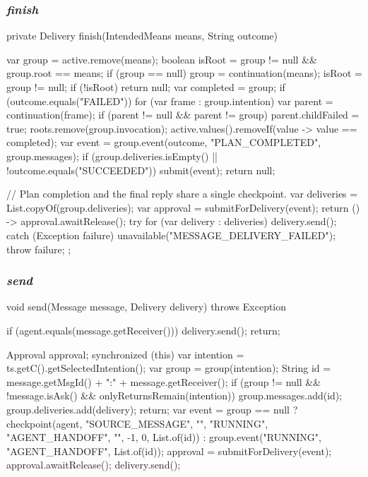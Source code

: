 \documentclass[12pt,a4paper,oneside]{extreport}
\begin{document}
\subsubsection*{\textit{finish}}
\begin{thesiscode}[firstnumber=224]
private Delivery finish(IntendedMeans means, String outcome) {
    var group = active.remove(means);
    boolean isRoot = group != null && group.root == means;
    if (group == null) { group = continuation(means); isRoot = group != null; }
    if (!isRoot) return null;
    var completed = group;
    if (outcome.equals("FAILED")) for (var frame : group.intention) {
        var parent = continuation(frame);
        if (parent != null && parent != group) parent.childFailed = true;
    }
    roots.remove(group.invocation); active.values().removeIf(value -> value == completed);
    var event = group.event(outcome, "PLAN_COMPLETED", group.messages);
    if (group.deliveries.isEmpty() || !outcome.equals("SUCCEEDED")) {
        submit(event);
        return null;
    }

    // Plan completion and the final reply share a single checkpoint.
    var deliveries = List.copyOf(group.deliveries);
    var approval = submitForDelivery(event);
    return () -> {
        approval.awaitRelease();
        try { for (var delivery : deliveries) delivery.send(); }
        catch (Exception failure) { unavailable("MESSAGE_DELIVERY_FAILED"); throw failure; }
    };
}
\end{thesiscode}

\subsubsection*{\textit{send}}
\begin{thesiscode}[firstnumber=251]
void send(Message message, Delivery delivery) throws Exception {
    if (agent.equals(message.getReceiver())) {
        delivery.send();
        return;
    }

    Approval approval;
    synchronized (this) {
        var intention = ts.getC().getSelectedIntention();
        var group = group(intention);
        String id = message.getMsgId() + ":" + message.getReceiver();
        if (group != null && !message.isAsk() && onlyReturnsRemain(intention)) {
            group.messages.add(id);
            group.deliveries.add(delivery);
            return;
        }
        var event = group == null
                ? checkpoint(agent, "SOURCE_MESSAGE", "", "RUNNING", "AGENT_HANDOFF", "", -1, 0, List.of(id))
                : group.event("RUNNING", "AGENT_HANDOFF", List.of(id));
        approval = submitForDelivery(event);
    }
    approval.awaitRelease();
    delivery.send();
}
\end{thesiscode}
\end{document}
